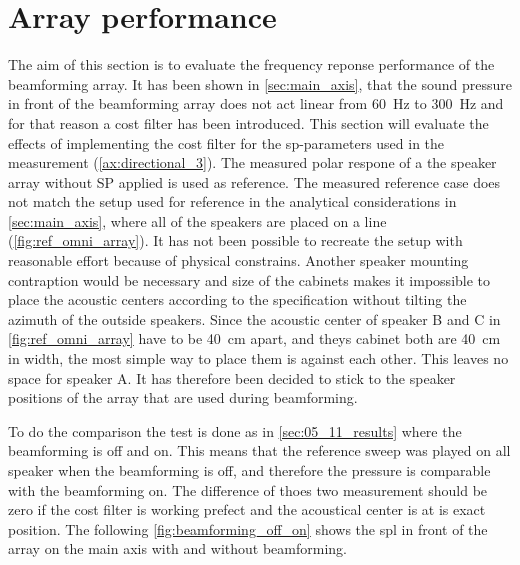 \section{Array performance} \label{sec:beamforming_array_spl}

The aim of this section is to evaluate the frequency reponse performance of the beamforming array. It has been shown in \autoref{sec:main_axis}, that the sound pressure in front of the beamforming array does not act linear from \SI{60}{\hertz} to \SI{300}{\hertz} and for that reason a cost filter has been introduced. This section will evaluate the effects of implementing the cost filter for the \gls{sp}-parameters used in the measurement (\autoref{ax:directional_3}). The measured polar respone of a the speaker array without \gls{SP} applied is used as reference. 
The measured reference case does not match the setup used for reference in the analytical considerations in \autoref{sec:main_axis}, where all of the speakers are placed on a line (\autoref{fig:ref_omni_array}). It has not been possible to recreate the setup with reasonable effort because of physical constrains. Another speaker mounting contraption would be necessary and size of the cabinets makes it impossible to place the acoustic centers according to the specification without tilting the azimuth of the outside speakers. Since the acoustic center of speaker B and C in \autoref{fig:ref_omni_array} have to be \SI{40}{\centi\meter} apart, and theys cabinet both are \SI{40}{\centi\meter} in width, the most simple way to place them is against each other. This leaves no space for speaker A.
It has therefore been decided to stick to the speaker positions of the array that are used during beamforming.

To do the comparison the test is done as in \autoref{sec:05_11_results} where the beamforming is off and on. This means that the reference sweep was played on all speaker when the beamforming is off, and therefore the pressure is comparable with the beamforming on. The difference of thoes two measurement should be zero if the cost filter is working prefect and the acoustical center is at is exact position. The following \autoref{fig:beamforming_off_on} shows the \gls{spl} in front of the array on the main axis with and without beamforming.

